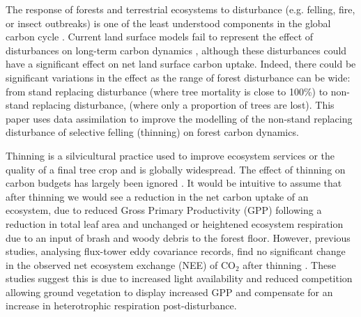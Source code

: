 The response of forests and terrestrial ecosystems to disturbance (e.g. felling, fire, or insect outbreaks) is one of the least understood components in the global carbon cycle \citep{ciais2014carbon}. Current land surface models fail to represent the effect of disturbances on long-term carbon dynamics \citep{running2008ecosystem}, although these disturbances could have a significant effect on net land surface carbon uptake. Indeed, there could be significant variations in the effect as the range of forest disturbance can be wide: from stand replacing disturbance (where tree mortality is close to 100\%) to non-stand replacing disturbance, (where only a proportion of trees are lost). This paper uses data assimilation to improve the modelling of the non-stand replacing disturbance of selective felling (thinning) on forest carbon dynamics.

Thinning is a silvicultural practice used to improve ecosystem services or the quality of a final tree crop and is globally widespread. The effect of thinning on carbon budgets has largely been ignored \citep{JGRG:JGRG779}. It would be intuitive to assume that after thinning we would see a reduction in the net carbon uptake of an ecosystem, due to reduced Gross Primary Productivity (GPP) following a reduction in total leaf area and unchanged or heightened ecosystem respiration due to an input of brash and woody debris to the forest floor. However, previous studies, analysing flux-tower eddy covariance records, find no significant change in the observed net ecosystem exchange (NEE) of CO\(_{2}\) after thinning \citep{vesala2005effect, moreaux2011paired,  dore2012recovery, Saunders20121, wilkinson2015effects}. These studies suggest this is due to increased light availability and reduced competition allowing ground vegetation to display increased GPP and compensate for an increase in heterotrophic respiration post-disturbance.  

